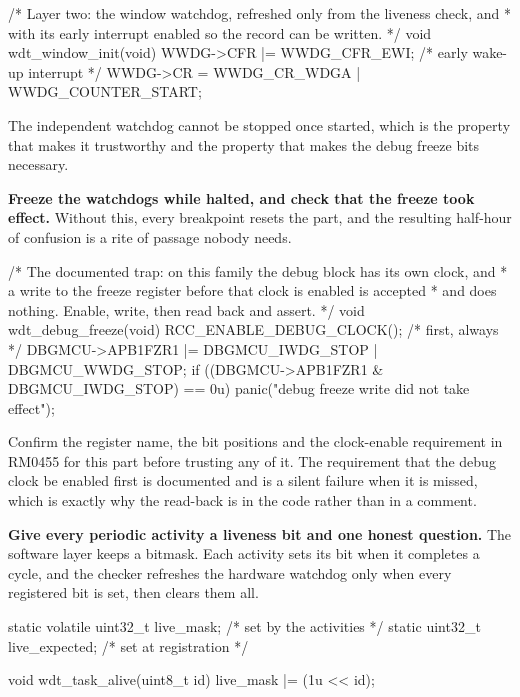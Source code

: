 \begin{steps}
\begin{ccode}
/* Layer two: the window watchdog, refreshed only from the liveness check, and
 * with its early interrupt enabled so the record can be written.           */
void wdt_window_init(void)
{
    WWDG->CFR |= WWDG_CFR_EWI;           /* early wake-up interrupt          */
    WWDG->CR   = WWDG_CR_WDGA | WWDG_COUNTER_START;
}
\end{ccode}
The independent watchdog cannot be stopped once started, which is the property
that makes it trustworthy and the property that makes the debug freeze bits
necessary.

\item \textbf{Freeze the watchdogs while halted, and check that the freeze took
effect.} Without this, every breakpoint resets the part, and the resulting
half-hour of confusion is a rite of passage nobody needs.
\begin{ccode}
/* The documented trap: on this family the debug block has its own clock, and
 * a write to the freeze register before that clock is enabled is accepted
 * and does nothing. Enable, write, then read back and assert.              */
void wdt_debug_freeze(void)
{
    RCC_ENABLE_DEBUG_CLOCK();                    /* first, always            */
    DBGMCU->APB1FZR1 |= DBGMCU_IWDG_STOP | DBGMCU_WWDG_STOP;
    if ((DBGMCU->APB1FZR1 & DBGMCU_IWDG_STOP) == 0u)
        panic("debug freeze write did not take effect");
}
\end{ccode}
Confirm the register name, the bit positions and the clock-enable requirement in
RM0455 for this part before trusting any of it. The requirement that the debug
clock be enabled first is documented and is a silent failure when it is missed,
which is exactly why the read-back is in the code rather than in a comment.

\item \textbf{Give every periodic activity a liveness bit and one honest
question.} The software layer keeps a bitmask. Each activity sets its bit when
it completes a cycle, and the checker refreshes the hardware watchdog only when
every registered bit is set, then clears them all.
\begin{ccode}
static volatile uint32_t live_mask;        /* set by the activities          */
static uint32_t          live_expected;    /* set at registration            */

void wdt_task_alive(uint8_t id) { live_mask |= (1u << id); }


\end{ccode}
\end{steps}
